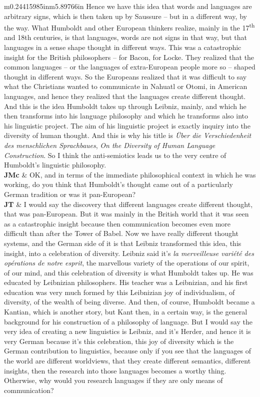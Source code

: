 \documentclass[12pt]{article}
\begin{document}
\begin{flushleft}
\begin{supertabular}{m{0.24415985in}m{5.89766in}}
Hence we have this idea that words and languages are arbitrary signs, which is then taken up by Saussure – but in a different way, by the way. What Humboldt and other European thinkers realize, mainly in the 17\textsuperscript{th} and 18th centuries, is that languages, words are not signs in that way, but that languages in a sense shape thought in different ways. This was a catastrophic insight for the British philosophers – for Bacon, for Locke. They realized that the common languages – or the languages of extra-European people more so – shaped thought in different ways. So the Europeans realized that it was difficult to say what the Christians wanted to communicate in Nahuatl or Otomi, in American languages, and hence they realized that the languages create different thought. And this is the idea Humboldt takes up through Leibniz, mainly, and which he then transforms into his language philosophy and which he transforms also into his linguistic project. The aim of his linguistic project is exactly inquiry into the diversity of human thought. And this is why his title is \textit{Über die Verschiedenheit des menschlichen Sprachbaues}, \textit{On the Diversity of Human Language Construction}. So I think the anti-semiotics leads us to the very centre of Humboldt’s linguistic philosophy.\\
\textbf{JMc}\newline
 &
OK, and in terms of the immediate philosophical context in which he was working, do you think that Humboldt’s thought came out of a particularly German tradition or was it pan-European?\\
\textbf{JT}\newline
 &
I would say the discovery that different languages create different thought, that was pan-European. But it was mainly in the British world that it was seen as a catastrophic insight because then communication becomes even more difficult than after the Tower of Babel. Now we have really different thought systems, and the German side of it is that Leibniz transformed this idea, this insight, into a celebration of diversity. Leibniz said it’s \textit{la merveilleuse variété des opérations de notre esprit}, the marvellous variety of the operations of our spirit, of our mind, and this celebration of diversity is what Humboldt takes up. He was educated by Leibnizian philosophers. His teacher was a Leibnizian, and his first education was very much formed by this Leibnizian joy of individualism, of diversity, of the wealth of being diverse. And then, of course, Humboldt became a Kantian, which is another story, but Kant then, in a certain way, is the general background for his construction of a philosophy of language. But I would say the very idea of creating a new linguistics is Leibniz, and it’s Herder, and hence it is very German because it’s this celebration, this joy of diversity which is the German contribution to linguistics, because only if you see that the languages of the world are different worldviews, that they create different semantics, different insights, then the research into those languages becomes a worthy thing. Otherwise, why would you research languages if they are only means of communication?\\

\end{supertabular}
\end{flushleft}
\end{document}
